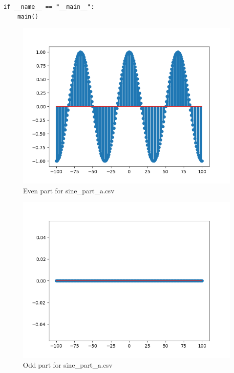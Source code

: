 \documentclass[10pt,a4paper, margin=1in]{article}
\begin{document}
\begin{enumerate}
\begin{enumerate}
\begin{lstlisting}
if __name__ == "__main__":
    main()
                \end{lstlisting}
                    \begin{figure}[H]
                        \centering
                        \includegraphics[scale=0.75]{sine_part_a_even.png}
                        \caption{Even part for sine\_part\_a.csv}
                    \end{figure}
                    \begin{figure}[H]
                        \centering
                        \includegraphics[scale=0.75]{sine_part_a_odd.png}
                        \caption{Odd part for sine\_part\_a.csv}
                    \end{figure}

\end{enumerate}
\end{enumerate}
\end{document}
